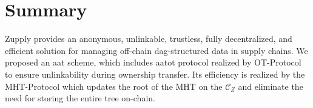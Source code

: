 \section{Summary}
\label{app:zupply-summary}
Zupply provides an anonymous, unlinkable, trustless, fully decentralized, and efficient solution for managing off-chain \gls{dag}-structured data in supply chains. We proposed an \gls{aat} scheme, which includes \gls{aatot} protocol realized by \textsf{OT-Protocol} to ensure unlinkability during ownership transfer. Its efficiency is realized by the \textsf{MHT-Protocol} which updates the root of the \textsf{MHT} on the $\mathcal{C}_Z$  and eliminate the need for storing the entire tree on-chain.




